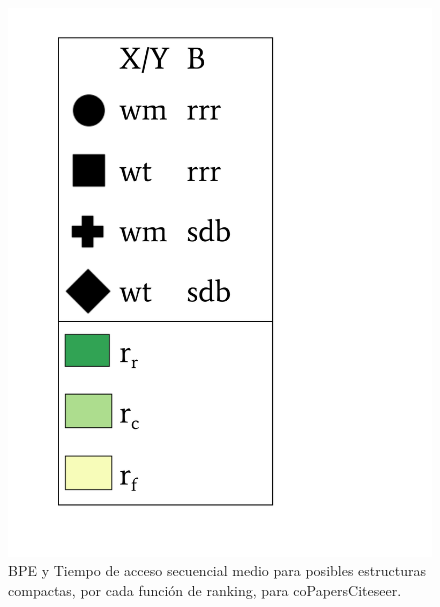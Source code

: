 \begin{frame}
\begin{figure}
\begin{minipage}{1\textwidth}
\begin{minipage}{0.15\textwidth}
    			\includegraphics[scale=.15, clip, trim=70 0 0 0]{../img/sdsl/label.pdf}
    		\end{minipage}	
    	\end{minipage}

	\caption{BPE y Tiempo de acceso secuencial medio para posibles estructuras compactas, por cada función de ranking, para coPapersCiteseer.}
\end{figure}

\end{frame}






